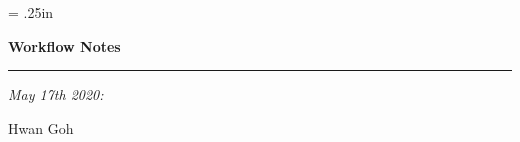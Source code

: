 \begin{titlepage}
\hoffset = .25in

\begin{center}

{\huge \bf Workflow Notes}

\rule{\linewidth}{0.8mm} \vspace{2.5cm}
\end{center}
\begin{flushright}

\emph{\large May 17th 2020:}

 \LARGE{ Hwan Goh} \vspace{10cm}

\end{flushright}

\end{titlepage}
